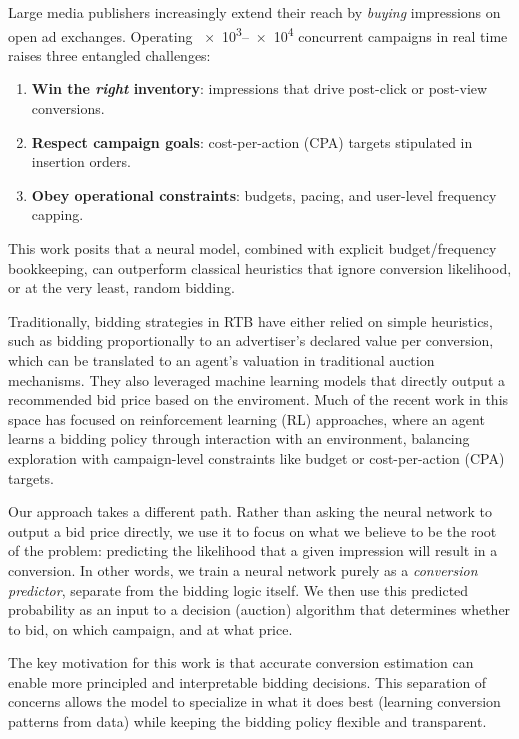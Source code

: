 \documentclass[11pt]{article}
\begin{document}
Large media publishers increasingly extend their reach by \emph{buying} impressions on open ad exchanges. Operating \num{e3}--\num{e4} concurrent campaigns in real time raises three entangled challenges:
\begin{enumerate}
  \item \textbf{Win the \emph{right} inventory}: impressions that
    drive post-click or post-view conversions.
  \item \textbf{Respect campaign goals}: cost-per-action (CPA) targets
    stipulated in insertion orders.
  \item \textbf{Obey operational constraints}: budgets, pacing, and
    user-level frequency capping.
\end{enumerate}
This work posits that a neural model, combined with explicit budget/frequency bookkeeping, can outperform classical heuristics that ignore conversion likelihood, or at the very least, random bidding.

Traditionally, bidding strategies in RTB have either relied on simple heuristics, such as bidding proportionally to an advertiser's declared value per conversion, which can be translated to an agent's valuation in traditional auction mechanisms. They also leveraged machine learning models that directly output a recommended bid price based on the enviroment. Much of the recent work in this space has focused on reinforcement learning (RL) approaches, where an agent learns a bidding policy through interaction with an environment, balancing exploration with campaign-level constraints like budget or cost-per-action (CPA) targets.

Our approach takes a different path. Rather than asking the neural network to output a bid price directly, we use it to focus on what we believe to be the root of the problem: predicting the likelihood that a given impression will result in a conversion. In other words, we train a neural network purely as a \emph{conversion predictor}, separate from the bidding logic itself. We then use this predicted probability as an input to a decision (auction) algorithm that determines whether to bid, on which campaign, and at what price.

The key motivation for this work is that accurate conversion estimation can enable more principled and interpretable bidding decisions. This separation of concerns allows the model to specialize in what it does best (learning conversion patterns from data) while keeping the bidding policy flexible and transparent.
\end{document}
